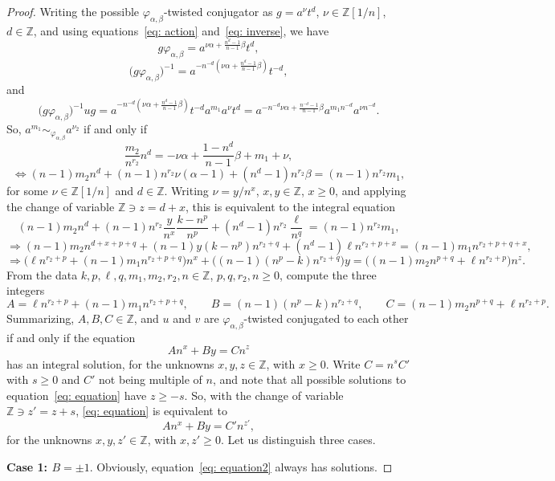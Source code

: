 \documentclass[english]{amsart}
\theoremstyle{definition}
\newcommand\ZZ{\mathbb{Z}}
\begin{document}
\begin{proof}
Writing the possible $\varphi_{\alpha, \beta}$-twisted conjugator as $g=a^{\nu}t^d$, $\nu\in \ZZ[1/n]$, $d\in \ZZ$, and using equations~\eqref{eq: action} and~\eqref{eq: inverse}, we have 
 $$
g\varphi_{\alpha,\beta} =a^{\nu \alpha + \frac{n^{d}-1}{n-1}\beta}t^{d},
 $$
 $$
\big( g\varphi_{\alpha,\beta} \big)^{-1} =a^{-n^{-d}(\nu \alpha + \frac{n^{d}-1}{n-1}\beta)}t^{-d},
 $$
and 
 $$
\big( g\varphi_{\alpha,\beta} \big)^{-1} ug= a^{-n^{-d}(\nu \alpha + \frac{n^{d}-1}{n-1}\beta)} t^{-d} a^{m_1} a^{\nu}t^d= a^{-n^{-d}\nu \alpha + \frac{n^{-d}-1}{n-1}\beta} a^{m_1 n^{-d}} a^{\nu n^{-d}}.
 $$
So, $a^{m_1}\sim_{\varphi_{\alpha, \beta}} a^{\nu_2}$ if and only if 
 $$
\frac{m_2}{n^{r_2}} n^d =-\nu \alpha +\frac{1-n^{d}}{n-1}\beta +m_1 +\nu, 
 $$
 $$
\Leftrightarrow (n-1)m_2 n^d +(n-1)n^{r_2}\nu (\alpha -1) +(n^{d}-1)n^{r_2}\beta =(n-1)n^{r_2}m_1, 
 $$
for some $\nu\in \ZZ[1/n]$ and $d\in \ZZ$. Writing $\nu =y/n^x$, $x,y\in \ZZ$, $x\geq 0$, and applying the change of variable $\ZZ \ni z=d+x$, this is equivalent to the integral equation  
 $$
(n-1)m_2 n^d +(n-1)n^{r_2}\frac{y}{n^x} \frac{k-n^p}{n^p} +(n^{d}-1)n^{r_2}\frac{\ell}{n^q} =(n-1)n^{r_2}m_1, 
 $$
 $$
\Rightarrow (n-1)m_2 n^{d+x+p+q} +(n-1)y(k-n^p)n^{r_2+q} +(n^{d}-1)\ell n^{r_2+p+x} =(n-1)m_1 n^{r_2+p+q+x}, 
 $$
 $$
\Rightarrow \Big( \ell n^{r_2+p}+(n-1)m_1 n^{r_2+p+q}\Big) n^x +\Big( (n-1)(n^p-k)n^{r_2+q} \Big) y =\Big( (n-1)m_2 n^{p+q} +\ell n^{r_2+p}\Big) n^{z}.
 $$
From the data $k, p, \ell, q, m_1, m_2, r_2, n\in \ZZ$, $p,q,r_2,n\geq 0$, compute the three integers 
 $$
A=\ell n^{r_2+p}+(n-1)m_1 n^{r_2+p+q},\qquad B=(n-1)(n^p-k)n^{r_2+q}, \qquad C=(n-1)m_2 n^{p+q}+\ell n^{r_2+p}.
 $$
Summarizing, $A,B,C\in \ZZ$, and $u$ and $v$ are $\varphi_{\alpha, \beta}$-twisted conjugated to each other if and only if the equation 
 \begin{equation}\label{eq: equation}
An^x +By=Cn^z
 \end{equation}
has an integral solution, for the unknowns $x,y,z\in \ZZ$, with $x\geq 0$. Write $C=n^s C'$ with $s\geq 0$ and $C'$ not being multiple of $n$, and note that all possible solutions to equation~\eqref{eq: equation} have $z\geq -s$. So, with the change of variable $\ZZ \ni z'=z+s$, \eqref{eq: equation} is equivalent to 
 \begin{equation}\label{eq: equation2}
An^x +By=C'n^{z'},
 \end{equation}
for the unknowns $x,y,z'\in \ZZ$, with $x,z'\geq 0$. Let us distinguish three cases. 

\textbf{Case 1: $B=\pm 1$}. Obviously, equation~\eqref{eq: equation2} always has solutions.  


\end{proof}
\end{document}
